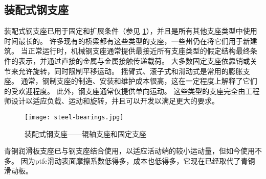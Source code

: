 \subsection{装配式钢支座}
装配式钢支座已用于固定和扩展条件（参见 \cref{fig:fabricated-steel-bearings}），并且是所有其他支座类型中使用时间最长的。 许多现有的桥梁都有这些类型的支座，一些州仍在将它们用于新建筑。 当正常运行时，机械钢支座通常提供最接近所有支座类型的假定结构最终条件的表示，并通过直接的金属与金属接触传递载荷。 大多数固定支座依靠销或关节来允许旋转，同时限制平移运动。 摇臂式、滚子式和滑动式是常用的膨胀支座。 通常，钢制支座的制造、安装和维护成本很高，这在一定程度上解释了它们的受欢迎程度。 此外，钢支座通常仅提供单向运动。 这些类型的支座完全由工程师设计以适应负载、运动和旋转，并且可以开发以满足更大的要求。

\begin{figure}
  \texttt{[image: steel-bearings.jpg]}
  \caption{装配式钢支座——辊轴支座和固定支座}
  \label{fig:fabricated-steel-bearings}
\end{figure}

青铜润滑板支座已与钢支座结合使用，以适应活动端的较小运动量，但如今使用不多。 因为\acrlong*{ptfe}滑动表面摩擦系数低得多，成本也低得多，它现在已经取代了青铜滑动板。


